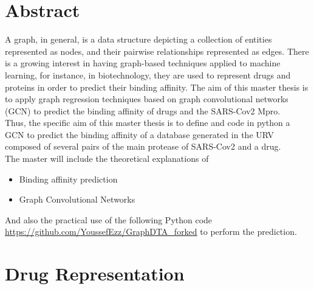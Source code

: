 \documentclass[11pt, a4paper]{article}
\begin{document}
\section{Abstract}
    A graph, in general, is a data structure depicting a collection of entities represented as nodes, and
    their pairwise relationships represented as edges. There is a growing interest in having graph-based
    techniques applied to machine learning, for instance, in biotechnology, they are used to represent
    drugs and proteins in order to predict their binding affinity. The aim of this master thesis is to apply
    graph regression techniques based on graph convolutional networks (GCN) to predict the binding
    affinity of drugs and the SARS-Cov2 Mpro.
    \\Thus, the specific aim of this master thesis is to define and code in python a GCN to predict the
    binding affinity of a database generated in the URV composed of several pairs of the main protease
    of SARS-Cov2 and a drug.
    \\The master will include the theoretical explanations of
    \begin{itemize}
        \item Binding affinity prediction
        \item Graph Convolutional Networks    
    \end{itemize}
    And also the practical use of the following Python code \url{https://github.com/YoussefEzz/GraphDTA_forked} \cite{3} to perform the prediction.
    
\section{Drug Representation}
\end{document}
